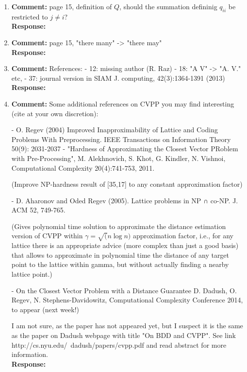 \documentclass[a4paper,10pt]{article}
\begin{document}
\begin{enumerate}
\item\textbf{Comment:}  
page 15, definition of $Q$, should the summation defininig $q_{ii}$ be restricted to $j\neq i$? 
\\\textbf{Response:}

\item\textbf{Comment:}  
page 15, "there many" -> "there may" 
\\\textbf{Response:}

\item\textbf{Comment:}  
References: 
- 12: missing author (R. Raz) 
- 18: "A V" -> "A. V." etc, 
- 37: journal version in SIAM J. computing, 42(3):1364-1391 (2013) 
\\\textbf{Response:}

\item\textbf{Comment:}  
Some additional references on CVPP you may find interesting 
(cite at your own discretion): 

- O. Regev (2004) Improved Inapproximability of Lattice and Coding Problems With Preprocessing. IEEE Transactions on Information Theory 50(9): 2031-2037 
- "Hardness of Approximating the Closest Vector PRoblem with Pre-Processing", M. Alekhnovich, S. Khot, G. Kindler, N. Vishnoi, Computational Complexity 20(4):741-753, 2011. 

(Improve NP-hardness result of [35,17] to any constant approximation factor) 

- D. Aharonov and Oded Regev (2005). Lattice problems in NP ∩ co-NP. J. ACM 52, 749-765. 

(Gives polynomial time solution to approximate the distance estimation version of CVPP within $\gamma=\sqrt(n \log n)$ approximation factor, i.e., for any lattice there is an appropriate advice (more complex than just a good basis) that allows to approximate in polynomial time the distance of any target point to the lattice within gamma, but without actually finding a nearby lattice point.) 

- On the Closest Vector Problem with a Distance Guarantee 
D. Dadush, O. Regev, N. Stephens-Davidowitz, Computational Complexity Conference 2014, to appear (next week!) 

I am not sure, as the paper has not appeared yet, but I suspect it is the same as the paper on Dadush webpage with title "On BDD and CVPP". 
See link 
http://cs.nyu.edu/~dadush/papers/cvpp.pdf 
and read abstract for more information.
\\\textbf{Response:}

\end{enumerate}





\end{document}
